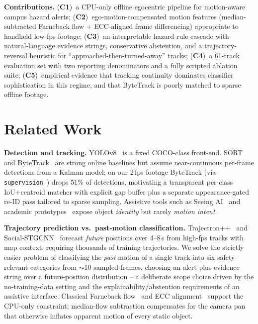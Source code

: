 \documentclass[10pt,twocolumn,letterpaper]{article}
\begin{document}
\noindent\textbf{Contributions.} (\textbf{C1})~a CPU-only offline
egocentric pipeline for motion-aware campus hazard alerts;
(\textbf{C2})~ego-motion-compensated motion features (median-subtracted
Farneback flow + ECC-aligned frame differencing) appropriate to
handheld low-fps footage; (\textbf{C3})~an interpretable hazard rule
cascade with natural-language evidence strings, conservative
abstention, and a trajectory-reversal heuristic for
``approached-then-turned-away'' tracks; (\textbf{C4})~a 61-track
evaluation set with two reporting denominators and a fully scripted
ablation suite; (\textbf{C5})~empirical evidence that tracking
continuity dominates classifier sophistication in this regime, and
that ByteTrack is poorly matched to sparse offline footage.

\section{Related Work}

\noindent\textbf{Detection and tracking.} YOLOv8~\cite{ultralytics} is
a fixed COCO-class front-end. SORT~\cite{sort} and
ByteTrack~\cite{bytetrack} are strong online baselines but assume
near-continuous per-frame detections from a Kalman model; on our
2\,fps footage ByteTrack (via
\texttt{supervision}~\cite{supervision}) drops 51\% of detections,
motivating a transparent per-class IoU+centroid matcher with explicit
gap buffer plus a separate appearance-gated re-ID pass tailored to
sparse sampling. Assistive tools such as
Seeing AI~\cite{seeingai} and academic prototypes~\cite{poggi2016}
expose object \emph{identity} but rarely \emph{motion intent}.

\noindent\textbf{Trajectory prediction vs.\ past-motion classification.}
Trajectron++~\cite{trajectronpp} and
Social-STGCNN~\cite{socialstgcnn} forecast \emph{future} positions
over 4--8\,s from high-fps tracks with map context, requiring
thousands of training trajectories. We solve the strictly easier
problem of classifying the \emph{past} motion of a single track into
six safety-relevant categories from $\sim$10 sampled frames, choosing
an alert plus evidence string over a future-position
distribution -- a deliberate scope choice driven by the no-training-data
setting and the explainability/abstention requirements of an
assistive interface. Classical Farneback flow~\cite{farneback} and
ECC alignment~\cite{ecc} support the CPU-only constraint;
median-flow subtraction compensates for the camera pan that
otherwise inflates apparent motion of every static object.
\end{document}
